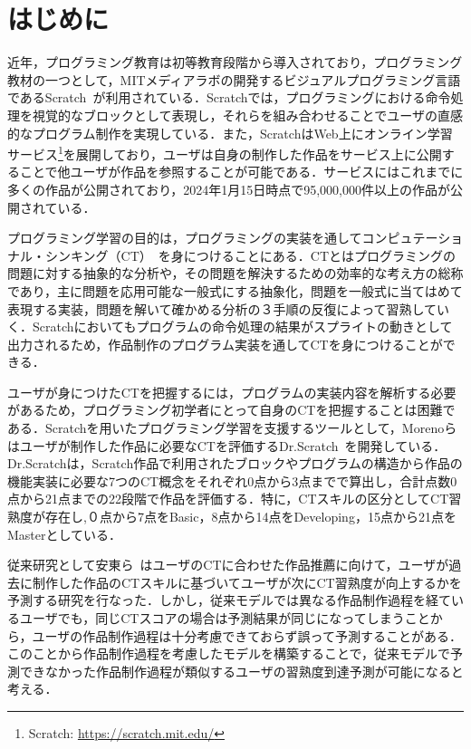 \documentclass[11pt,dvipdfmx]{jreport}
\begin{document}
\chapter{はじめに}
近年，プログラミング教育は初等教育段階から導入されており，プログラミング教材の一つとして，MITメディアラボの開発するビジュアルプログラミング言語であるScratch~\cite{Resnick_2009}が利用されている．Scratchでは，プログラミングにおける命令処理を視覚的なブロックとして表現し，それらを組み合わせることでユーザの直感的なプログラム制作を実現している．また，ScratchはWeb上にオンライン学習サービス\footnote{Scratch: \url{https://scratch.mit.edu/}}を展開しており，ユーザは自身の制作した作品をサービス上に公開することで他ユーザが作品を参照することが可能である．サービスにはこれまでに多くの作品が公開されており，2024年1月15日時点で95,000,000件以上の作品が公開されている．

プログラミング学習の目的は，プログラミングの実装を通してコンピュテーショナル・シンキング（CT）~\cite{Wing_2006}を身につけることにある．CTとはプログラミングの問題に対する抽象的な分析や，その問題を解決するための効率的な考え方の総称であり，主に問題を応用可能な一般式にする抽象化，問題を一般式に当てはめて表現する実装，問題を解いて確かめる分析の３手順の反復によって習熟していく．Scratchにおいてもプログラムの命令処理の結果がスプライトの動きとして出力されるため，作品制作のプログラム実装を通してCTを身につけることができる．

ユーザが身につけたCTを把握するには，プログラムの実装内容を解析する必要があるため，プログラミング初学者にとって自身のCTを把握することは困難である．Scratchを用いたプログラミング学習を支援するツールとして，Morenoらはユーザが制作した作品に必要なCTを評価するDr.Scratch~\cite{Moreno_2015}を開発している．Dr.Scratchは，Scratch作品で利用されたブロックやプログラムの構造から作品の機能実装に必要な7つのCT概念をそれぞれ0点から3点までで算出し，合計点数0点から21点までの22段階で作品を評価する．特に，CTスキルの区分としてCT習熟度が存在し,０点から7点をBasic，8点から14点をDeveloping，15点から21点をMasterとしている．

従来研究として安東ら~\cite{Ando_2021}はユーザのCTに合わせた作品推薦に向けて，ユーザが過去に制作した作品のCTスキルに基づいてユーザが次にCT習熟度が向上するかを予測する研究を行なった．しかし，従来モデルでは異なる作品制作過程を経ているユーザでも，同じCTスコアの場合は予測結果が同じになってしまうことから，ユーザの作品制作過程は十分考慮できておらず誤って予測することがある．このことから作品制作過程を考慮したモデルを構築することで，従来モデルで予測できなかった作品制作過程が類似するユーザの習熟度到達予測が可能になると考える．
\end{document}
